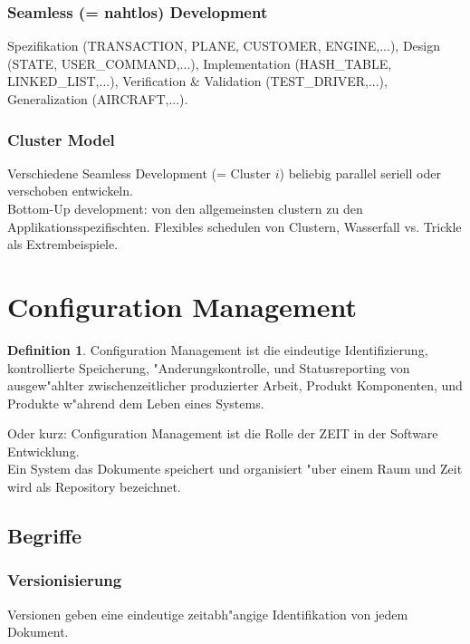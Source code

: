 \documentclass[german, 10pt, a4paper, twocolumn]{scrartcl}
\theoremstyle{definition}
\newtheorem*{definition}{Definition}
\begin{document}
\subsubsection{Seamless (= nahtlos) Development}

Spezifikation (TRANSACTION, PLANE, CUSTOMER, ENGINE,...), Design (STATE, USER\_COMMAND,...), Implementation (HASH\_TABLE, LINKED\_LIST,...), Verification \& Validation (TEST\_DRIVER,...), Generalization (AIRCRAFT,...).

\subsubsection{Cluster Model}

Verschiedene Seamless Development (= Cluster $i$) beliebig parallel seriell oder verschoben entwickeln.\\

Bottom-Up development: von den allgemeinsten clustern zu den Applikationsspezifischten. Flexibles schedulen von Clustern, Wasserfall vs. Trickle als Extrembeispiele.

\section{Configuration Management}

\begin{definition}
	Configuration Management ist die eindeutige Identifizierung, kontrollierte Speicherung, "Anderungskontrolle, und Statusreporting von ausgew"ahlter zwischenzeitlicher produzierter Arbeit, Produkt Komponenten, und Produkte w"ahrend dem Leben eines Systems.
\end{definition}

Oder kurz: Configuration Management ist die Rolle der ZEIT in der Software Entwicklung.\\

Ein System das Dokumente speichert und organisiert "uber einem Raum und Zeit wird als Repository bezeichnet.

\subsection{Begriffe}

\subsubsection{Versionisierung}

Versionen geben eine eindeutige zeitabh"angige Identifikation von jedem Dokument.
\end{document}
